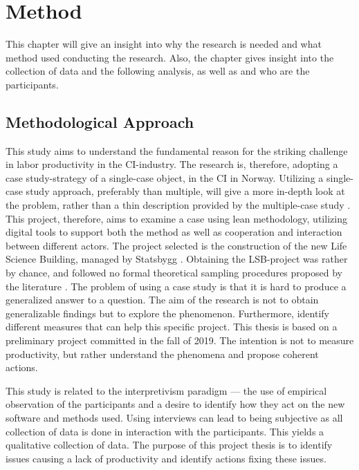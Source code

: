 
\chapter{Method} \label{chp:method}
This chapter will give an insight into why the research is needed and what method used conducting the research. Also, the chapter gives insight into the collection of data and the following analysis, as well as and who are the participants.

\section{Methodological Approach} \label{sec:purpose}
This study aims to understand the fundamental reason for the striking challenge in labor productivity in the CI-industry. The research is, therefore, adopting a case study-strategy of a single-case object, in the CI in Norway. Utilizing a single-case study approach, preferably than multiple, will give a more in-depth look at the problem, rather than a thin description provided by the multiple-case study \cite{yin1993case}. This project, therefore, aims to examine a case using lean methodology, utilizing digital tools to support both the method as well as cooperation and interaction between different actors. The project selected is the construction of the new Life Science Building, managed by Statsbygg \cite{statsbygg2019uio}. Obtaining the LSB-project was rather by chance, and followed no formal theoretical sampling procedures proposed by the literature \cite{yin1993case}. The problem of using a case study is that it is hard to produce a generalized answer to a question. The aim of the research is not to obtain generalizable findings but to explore the phenomenon. Furthermore, identify different measures that can help this specific project. This thesis is based on a preliminary project committed in the fall of 2019. The intention is not to measure productivity, but rather understand the phenomena and propose coherent actions.

This study is related to the interpretivism paradigm — the use of empirical observation of the participants and a desire to identify how they act on the new software and methods used. Using interviews can lead to being subjective as all collection of data is done in interaction with the participants. This yields a qualitative collection of data. The purpose of this project thesis is to identify issues causing a lack of productivity and identify actions fixing these issues. 

